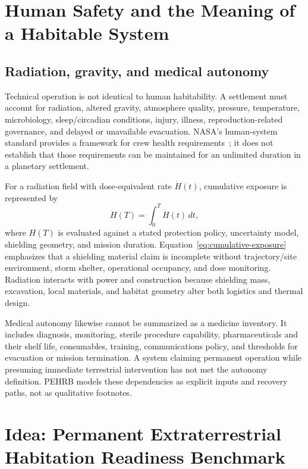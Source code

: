 \documentclass[10pt,conference]{IEEEtran}
\begin{document}
\section{Human Safety and the Meaning of a Habitable System}
\label{sec:human-safety}

\subsection{Radiation, gravity, and medical autonomy}

Technical operation is not identical to human habitability. A settlement must account for radiation, altered gravity, atmosphere quality, pressure, temperature, microbiology, sleep/circadian conditions, injury, illness, reproduction-related governance, and delayed or unavailable evacuation. NASA's human-system standard provides a framework for crew health requirements~\cite{nasastd3001}; it does not establish that those requirements can be maintained for an unlimited duration in a planetary settlement.

For a radiation field with dose-equivalent rate $\dot{H}(t)$, cumulative exposure is represented by
\begin{equation}
H(T)=\int_0^T\dot{H}(t)\,dt,
\label{eq:cumulative-exposure}
\end{equation}
where $H(T)$ is evaluated against a stated protection policy, uncertainty model, shielding geometry, and mission duration. Equation~\eqref{eq:cumulative-exposure} emphasizes that a shielding material claim is incomplete without trajectory/site environment, storm shelter, operational occupancy, and dose monitoring. Radiation interacts with power and construction because shielding mass, excavation, local materials, and habitat geometry alter both logistics and thermal design.

Medical autonomy likewise cannot be summarized as a medicine inventory. It includes diagnosis, monitoring, sterile procedure capability, pharmaceuticals and their shelf life, consumables, training, communications policy, and thresholds for evacuation or mission termination. A system claiming permanent operation while presuming immediate terrestrial intervention has not met the autonomy definition. PEHRB models these dependencies as explicit inputs and recovery paths, not as qualitative footnotes.

\section{Idea: Permanent Extraterrestrial Habitation Readiness Benchmark}
\label{sec:idea}
\end{document}
